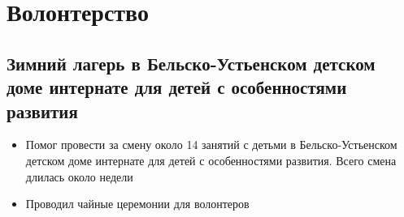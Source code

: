 \documentclass[11pt]{article}
\begin{document}
\section{Волонтерство}
\label{sec:org427a334}
\subsection{Зимний лагерь в Бельско-Устьенском детском доме интернате для детей с особенностями развития}
\label{sec:orgb0267e1}
\begin{itemize}
\item Помог провести за смену около 14 занятий с детьми в Бельско-Устьенском детском доме интернате для детей с особенностями развития. Всего смена длилась около недели
\item Проводил чайные церемонии для волонтеров
\end{itemize}
\end{document}
